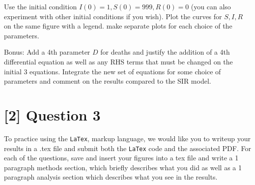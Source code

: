 \documentclass{article}
\begin{document}
Use the initial condition $I(0) = 1, S(0)=999, R(0) = 0$ (you can also experiment with other initial conditions if you wish).
Plot the curves for $S, I, R$ on the same figure with a legend. make separate plots for each choice of the parameters.

Bonus: Add a 4th parameter $D$ for deaths and justify the addition of a 4th differential equation as well as any RHS terms that must be changed on the initial 3 equations. Integrate the new set of equations for some choice of parameters and comment on the results compared to the SIR model.

\section*{[2] Question 3}

To practice using the \texttt{LaTex}, markup language, we would like you to writeup your results in a .tex file and submit both the \texttt{LaTex} code and the associated PDF. For each of the questions, save and insert your figures into a tex file and write a 1 paragraph methods section, which briefly describes what you did as well as a 1 paragraph analysis section which describes what you see in the results.
\end{document}
